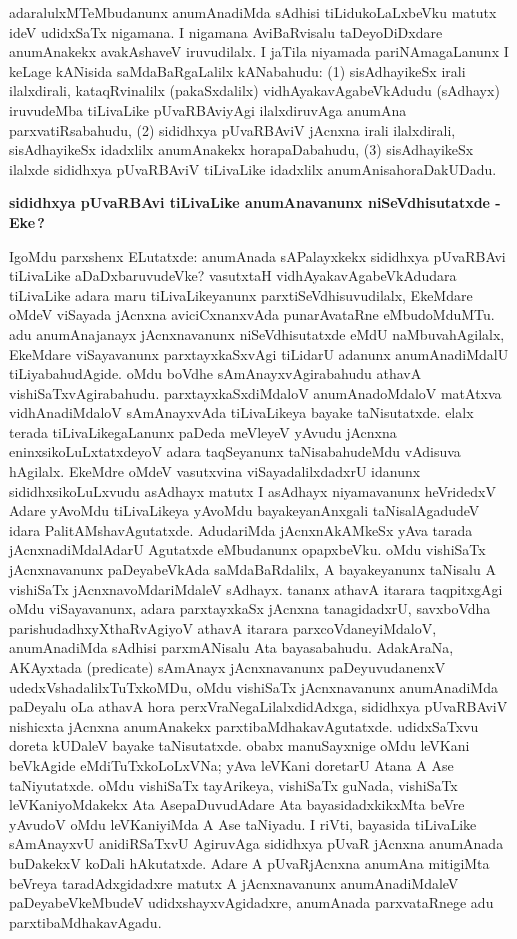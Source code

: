adaralulxMTeMbudanunx anumAnadiMda sAdhisi tiLidukoLaLxbeVku matutx ideV udidxSaTx nigamana. I nigamana AviBaRvisalu taDeyoDiDxdare anumAnakekx avakAshaveV iruvudilalx. I jaTila niyamada pariNAmagaLanunx I keLage kANisida saMdaBaRgaLalilx kANabahudu: (1) sisAdhayikeSx irali ilalxdirali, kataqRvinalilx (pakaSxdalilx) vidhAyakavAgabeVkAdudu (sAdhayx) iruvudeMba tiLivaLike pUvaRBAviyAgi ilalxdiruvAga anumAna parxvatiRsabahudu, (2) sididhxya pUvaRBAviV jAcnxna irali ilalxdirali, sisAdhayikeSx idadxlilx anumAnakekx horapaDabahudu, (3) sisAdhayikeSx ilalxde sididhxya pUvaRBAviV tiLivaLike idadxlilx anumAnisahoraDakUDadu.

\medskip
\begin{center}
{\Large\bf sididhxya pUvaRBAvi tiLivaLike anumAnavanunx niSeVdhisutatxde - Eke\,?}
\end{center}

IgoMdu parxshenx ELutatxde: anumAnada sAPalayxkekx sididhxya pUvaRBAvi tiLi\-vaLike aDaDxbaruvudeVke? vasutxtaH vidhAyakavAgabeVkAdudara tiLivaLike adara maru tiLi\-vaLikeyanunx parxtiSeVdhisuvudilalx, EkeMdare oMdeV viSayada jAcnxna aviciCxnanxvAda puna\-rA\-vataRne eMbudoMduMTu. adu anumAnajanayx jAcnxnavanunx niSeVdhisutatxde eMdU naMbuvahAgilalx, EkeMdare viSayavanunx parxtayxkaSxvAgi tiLidarU adanunx anumAna\-diMdalU tiLiyabahudAgide. oMdu boVdhe sAmAnayxvAgirabahudu athavA vishiSaTx\-vAgirabahudu. parxtayxkaSxdiMdaloV anumAnadoMdaloV matAtxva vidhAna\-diMdaloV sAmAnayxvAda tiLivaLikeya bayake taNisutatxde. elalx terada tiLivaLikegaLanunx paDeda meVleyeV yAvudu jAcnxna eninxsikoLuLxtatxdeyoV adara taqSeyanunx taNisabahudeMdu vAdisuva hAgilalx. EkeMdre oMdeV vasutxvina viSayadalilxdadxrU idanunx sididhxsi\-koLuLx\-vudu asAdhayx matutx I asAdhayx niyamavanunx heVridedxV Adare yAvoMdu tiLi\-vaLikeya yAvoMdu bayakeyanAnxgali taNisalAgadudeV idara PalitAMshavAgutatxde. Aduda\-riMda jAcnxnAkAMkeSx yAva tarada jAcnxnadiMdalAdarU Agutatxde eMbudanunx opapxbeVku. oMdu vishiSaTx jAcnxnavanunx paDeyabeVkAda saMdaBaRdalilx, A bayakeyanunx taNisalu A vishiSaTx jAcnxnavoMdariMdaleV sAdhayx. tananx athavA itarara taqpitxgAgi oMdu viSaya\-vanunx, adara parxtayxkaSx jAcnxna tanagidadxrU, savxboVdha pari\-shudadhxyXthaRvAgiyoV athavA itarara parxcoVdaneyiMdaloV, anumAnadiMda sAdhisi parxmANisalu Ata bayasabahudu. AdakAraNa, AKAyxtada {\rm(predicate)} sAmAnayx jAcnxnavanunx paDeyuvudanenxV udedxVsha\-dalilxTuTxkoMDu, oMdu vishiSaTx jAcnxnavanunx anumAnadiMda paDeyalu oLa athavA hora perxVraNegaLilalxdidAdxga, sididhxya pUvaRBAviV nishicxta jAcnxna anumAnakekx parxtibaMdhaka\-vAgutatxde. udidxSaTxvu doreta kUDaleV bayake taNisutatxde. obabx manuSayxnige oMdu leVKani beVkAgide eMdiTuTx\-koLoLxVNa; yAva leVKani doretarU Atana A Ase taNiyu\-tatxde. oMdu vishiSaTx tayArikeya, vishiSaTx guNada, vishiSaTx leVKaniyoMdakekx Ata AsepaDuvudAdare Ata bayasidadxkikxMta beVre yAvudoV oMdu leVKani\-yiMda A Ase taNiyadu. I riVti, bayasida tiLivaLike sAmAnayxvU anidiRSaTxvU AgiruvAga sididhxya pUvaR jAcnxna anumAnada buDakekxV koDali hAkutatxde. Adare A pUvaR\-jAcnxna anumAna mitigiMta beVreya taradAdxgidadxre matutx A jAcnxnavanunx anumAnadiMdaleV paDeyabeVkeMbudeV udidxshayxvAgidadxre, anumAnada parxvataRnege adu parxtibaMdhaka\-vAgadu.


